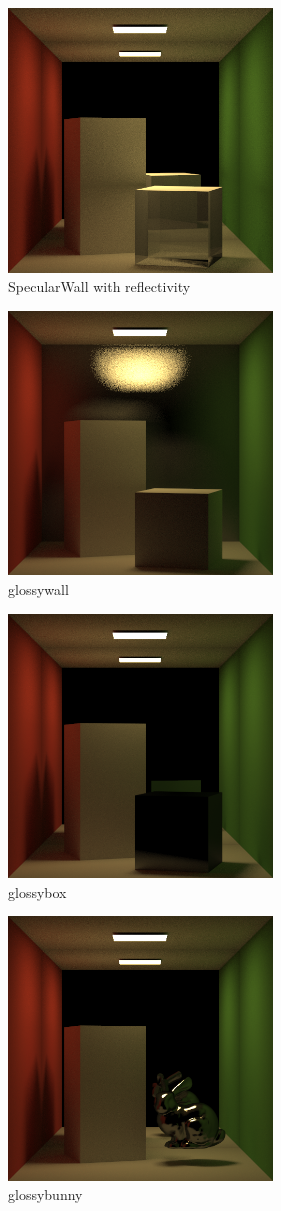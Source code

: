 \documentclass[acmtog]{acmart}
\begin{document}
\begin{figure}[h]
	\centering
	\includegraphics[width=7cm,height=7cm]{spec_reflect.PNG}
	\caption{SpecularWall with reflectivity}
\end{figure}
\begin{figure}[h]
	\centering
	\includegraphics[width=7cm,height=7cm]{glossy.png}
	\caption{glossywall}
\end{figure}
\begin{figure}[h]
	\centering
	\includegraphics[width=7cm,height=7cm]{box_glossy.png}
	\caption{glossybox}
\end{figure}
\begin{figure}[h]
	\centering
	\includegraphics[width=7cm,height=7cm]{bunny_glossy.png}
	\caption{glossybunny}
\end{figure}
\end{document}
